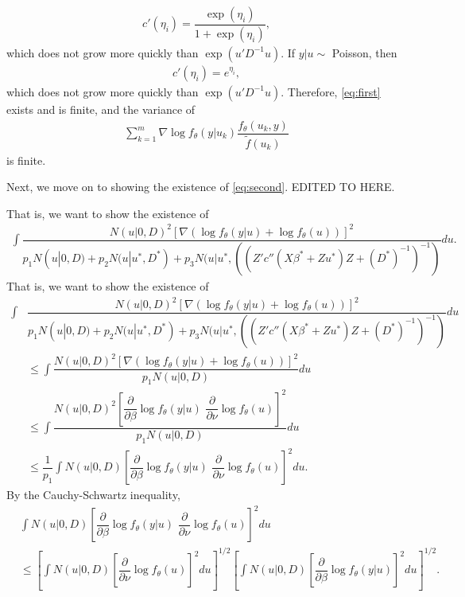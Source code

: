 \documentclass{article}
\begin{document}
\begin{align}
c'(\eta_i)= \dfrac{\exp(\eta_i)}{1+\exp(\eta_i)},
\end{align}
which does not grow more quickly than $\exp(u'D^{-1}u)$. If $y|u \sim$ Poisson, then
\begin{align}
c'(\eta_i)= e^{\eta_i},
\end{align}
which does not grow more quickly than $\exp(u'D^{-1}u)$. Therefore, \eqref{eq:first} exists and is finite, and the variance of 
\begin{align}
\sum_{k=1}^m \nabla \log f_\theta (y|u_k) \dfrac{f_\theta(u_k,y)}{\tilde{f}(u_k)}
\end{align}
is finite.

Next, we move on to showing the existence of \eqref{eq:second}.
EDITED TO HERE.

 That is, we want to show the existence of
\begin{align}
\int \dfrac{N(u|0,D)^2 \left[\nabla \left(\log f_\theta(y|u)+\log f_\theta (u) \right) \right]^2}{p_1 N(u|0,D)+p_2 N(u|u^*, D^*) + p_3 N(u|u^*, ((Z'  c''(X \beta^*+Zu^*) Z +(D^*)^{-1}   )^{-1})} du.
\end{align}
That is, we want to show the existence of
\begin{align}
\int &\dfrac{N(u|0,D)^2 \left[\nabla \left(\log f_\theta(y|u)+\log f_\theta (u) \right) \right]^2}{p_1 N(u|0,D)+p_2 N(u|u^*, D^*) + p_3 N(u|u^*, ((Z'  c''(X \beta^*+Zu^*) Z +(D^*)^{-1}   )^{-1})} du \\
&\leq \int  \dfrac{N(u|0,D)^2 \left[\nabla \left(\log f_\theta(y|u) + \log f_\theta (u) \right) \right]^2}{p_1 N(u|0,D)} du  \\
&\leq  \int \dfrac{N(u|0,D)^2 \left[ \dfrac{\partial}{\partial \beta} \log f_\theta(y|u) \, \, \dfrac{\partial}{\partial \nu} \log f_\theta (u)  \right]^2}{p_1 N(u|0,D)} du  \\
&\leq \dfrac{1}{p_1}  \int N(u|0,D) \left[ \dfrac{\partial}{\partial \beta}\log f_\theta(y|u) \, \, \dfrac{\partial}{\partial \nu} \log f_\theta (u)  \right]^2 du.
\end{align}
By the Cauchy-Schwartz inequality, 
\begin{align}
  &\int N(u|0,D) \left[ \dfrac{\partial}{\partial \beta}\log f_\theta(y|u) \, \, \dfrac{\partial}{\partial \nu} \log f_\theta (u)  \right]^2 du \\
& \leq \left[  \int N(u|0,D) \left[  \dfrac{\partial}{\partial \nu} \log f_\theta (u)  \right]^2 du \right]^{1/2}  \left[  \int N(u|0,D) \left[ \dfrac{\partial}{\partial \beta}\log f_\theta(y|u)   \right]^2 du \right]^{1/2} .
\end{align}
\end{document}
